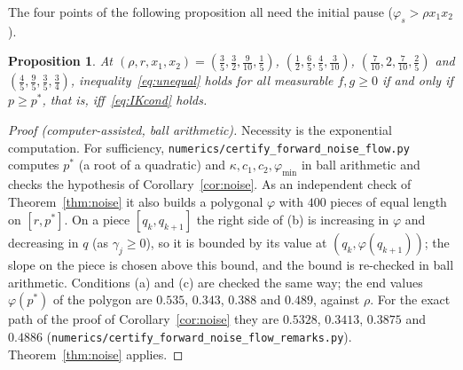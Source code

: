 \documentclass[11pt]{amsart}
\newtheorem{proposition}[theorem]{Proposition}
\theoremstyle{definition}
\begin{document}
The four points of the following proposition all need the initial pause ($\varphi_s>\rho x_1x_2$).

\begin{proposition}\label{prop:noisecert}
At $(\rho,r,x_1,x_2)=(\frac35,\frac32,\frac9{10},\frac15)$, $(\frac12,\frac65,\frac45,\frac3{10})$, $(\frac7{10},2,\frac7{10},\frac25)$
and $(\frac45,\frac95,\frac35,\frac34)$, inequality~\eqref{eq:unequal} holds for all measurable $f,g\ge0$ if and only
if $p\ge p^*$, that is, iff~\eqref{eq:IKcond} holds.
\end{proposition}

\begin{proof}[Proof (computer-assisted, ball arithmetic)]
Necessity is the exponential computation. For sufficiency, \texttt{numerics/certify\_forward\_noise\_flow.py} computes
$p^*$ (a root of a quadratic) and $\kappa,c_1,c_2,\varphi_{\min}$ in ball arithmetic and checks the hypothesis of
Corollary~\ref{cor:noise}. As an independent check of Theorem~\ref{thm:noise} it also builds a polygonal $\varphi$ with
$400$ pieces of equal length on $[r,p^*]$. On a piece $[q_k,q_{k+1}]$ the right side of (b) is increasing in $\varphi$ and
decreasing in $q$ (as $\gamma_j\ge0$), so it is bounded by its value at $(q_k,\varphi(q_{k+1}))$; the slope on the piece is
chosen above this bound, and the bound is re-checked in ball arithmetic. Conditions (a) and (c) are checked the same
way; the end values $\varphi(p^*)$ of the polygon are $0.535$, $0.343$, $0.388$ and $0.489$, against $\rho$. For the
exact path of the proof of Corollary~\ref{cor:noise} they are $0.5328$, $0.3413$, $0.3875$ and $0.4886$
(\texttt{numerics/certify\_forward\_noise\_flow\_remarks.py}). Theorem~\ref{thm:noise} applies.
\end{proof}
\end{document}
